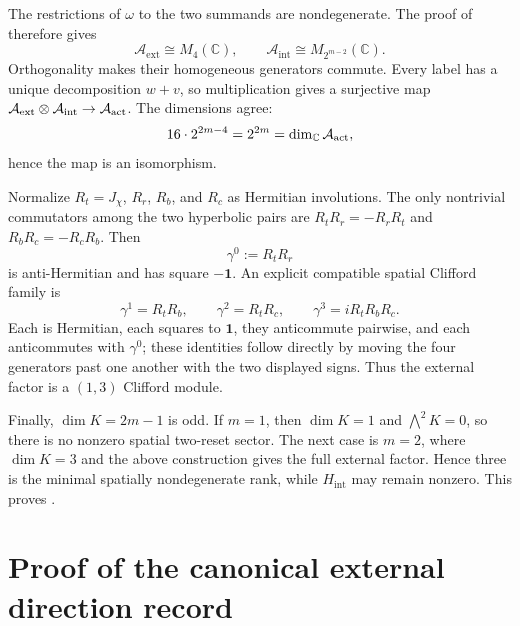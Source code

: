 \documentclass[11pt]{article}
\theoremstyle{definition}
\theoremstyle{remark}
\newcommand{\C}{\mathbb C}
\newcommand{\one}{\mathbf 1}
\newcommand{\A}{\mathcal A}
\newcommand{\ext}{\mathrm{ext}}
\newcommand{\intr}{\mathrm{int}}
\begin{document}
The restrictions of $\omega$ to the two summands are nondegenerate.  The proof
of  therefore gives
\[
 \A_{\ext}\cong M_4(\C),
 \qquad
 \A_{\intr}\cong M_{2^{m-2}}(\C).
\]
Orthogonality makes their homogeneous generators commute.  Every label has a
unique decomposition $w+v$, so multiplication gives a surjective map
$\A_{\ext}\otimes\A_{\intr}\to\A_{\rm act}$.  The dimensions agree:
\[
 16\cdot 2^{2m-4}=2^{2m}=\dim_\C\A_{\rm act},
\]
hence the map is an isomorphism.

Normalize $R_t=J_\chi$, $R_r$, $R_b$, and $R_c$ as Hermitian involutions.
The only nontrivial commutators among the two hyperbolic pairs are
$R_tR_r=-R_rR_t$ and $R_bR_c=-R_cR_b$.  Then
\[
 \gamma^0:=R_tR_r
\]
is anti-Hermitian and has square $-\one$.  An explicit compatible spatial
Clifford family is
\[
 \gamma^1=R_tR_b,
 \qquad
 \gamma^2=R_tR_c,
 \qquad
 \gamma^3=iR_tR_bR_c.
\]
Each is Hermitian, each squares to $\one$, they anticommute pairwise, and each
anticommutes with $\gamma^0$; these identities follow directly by moving the
four generators past one another with the two displayed signs.  Thus the
external factor is a $(1,3)$ Clifford module.

Finally, $\dim K=2m-1$ is odd.  If $m=1$, then $\dim K=1$ and
$\bigwedge^2K=0$, so there is no nonzero spatial two-reset sector.  The next
case is $m=2$, where $\dim K=3$ and the above construction gives the full
external factor.  Hence three is the minimal spatially nondegenerate rank,
while $H_{\intr}$ may remain nonzero.  This proves
.

\section{Proof of the canonical external direction record}
\label{app:proof-octahedral-record}
\end{document}
